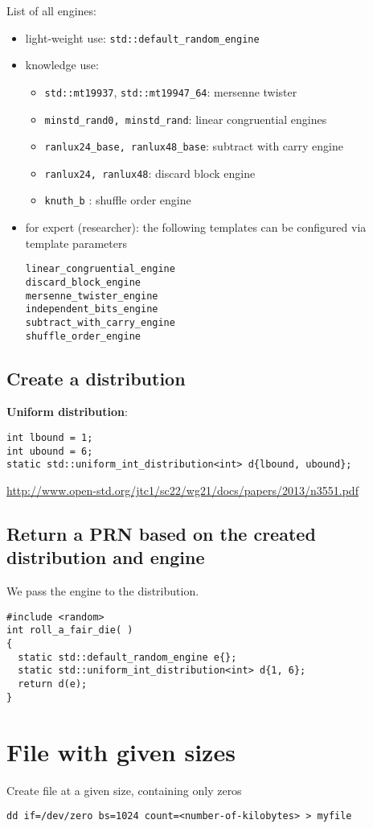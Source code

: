 List of all engines:
\begin{itemize}
  \item light-weight use:   \verb!std::default_random_engine!
  \item knowledge use: 
\begin{itemize}
  
  \item \verb!std::mt19937!, \verb!std::mt19947_64!: mersenne twister
  
  \item \verb!minstd_rand0, minstd_rand!: linear congruential engines
  
  \item \verb!ranlux24_base, ranlux48_base!: subtract with carry engine
  
   \item \verb!ranlux24, ranlux48!: discard block engine
   \item \verb!knuth_b! : shuffle order engine
\end{itemize}
  \item for expert (researcher): the following templates can be configured via template parameters 

\begin{verbatim}
linear_congruential_engine 
discard_block_engine
mersenne_twister_engine 
independent_bits_engine
subtract_with_carry_engine 
shuffle_order_engine

\end{verbatim}
\end{itemize}

\subsection{Create a distribution}

{\bf Uniform distribution}:
\begin{lstlisting}
int lbound = 1;
int ubound = 6;
static std::uniform_int_distribution<int> d{lbound, ubound};
\end{lstlisting}

\url{http://www.open-std.org/jtc1/sc22/wg21/docs/papers/2013/n3551.pdf}

\subsection{Return a PRN based on the created distribution and engine}

We pass the engine to the distribution.

\begin{lstlisting}
#include <random>
int roll_a_fair_die( )
{
  static std::default_random_engine e{};
  static std::uniform_int_distribution<int> d{1, 6};
  return d(e);
}
\end{lstlisting}




\section{File with given sizes}

Create file at a given size, containing only zeros
\begin{verbatim}
dd if=/dev/zero bs=1024 count=<number-of-kilobytes> > myfile
\end{verbatim}

